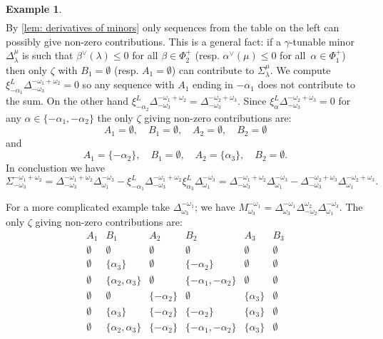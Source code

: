 \documentclass[a4paper]{amsart}
\theoremstyle{definition}
\newtheorem{example}[theorem]{Example}
\begin{document}
\begin{example}
\[\begin{array}{ccc}
    \end{array}
  \]
  By \cref{lem: derivatives of minors} only sequences from the table on the left can possibly give non-zero contributions.
  This is a general fact: if a $\gamma$-tunable minor $\Delta_\lambda^\mu$ is such that $\beta^\vee(\lambda)\leq0$ for all $\beta\in\Phi^+_2$ (resp. $\alpha^\vee(\mu)\leq0$ for all~$\alpha\in\Phi^+_1$) then only $\zeta$ with $B_1=\emptyset$ (resp. $A_1=\emptyset$) can contribute to $\Sigma_\lambda^\mu$.
  We compute $\xi_{-\alpha_1}^L\Delta_{-\omega_3}^{-\omega_1+\omega_2}=0$ so any sequence with $A_1$ ending in $-\alpha_1$ does not contribute to the sum.
  On the other hand $\xi_{-\alpha_2}^L\Delta_{-\omega_3}^{-\omega_1+\omega_2}=\Delta_{-\omega_3}^{-\omega_2+\omega_3}$. 
  Since $\xi_\alpha^L \Delta_{-\omega_3}^{-\omega_2+\omega_3}=0$ for any $\alpha\in\{-\alpha_1, -\alpha_2\}$ the only $\zeta$ giving non-zero contributions are:
  \[
    A_1=\emptyset,\quad B_1 =\emptyset,\quad A_2=\emptyset,\quad B_2=\emptyset
  \]
  and
  \[
    A_1=\{-\alpha_2\},\quad B_1 =\emptyset,\quad A_2=\{\alpha_3\},\quad B_2=\emptyset.
  \]
  In conclustion we have 
  \[
    \Sigma_{-\omega_3}^{-\omega_1+\omega_2} 
    = 
    \Delta_{-\omega_3}^{-\omega_1+\omega_2} \Delta_{\omega_1}^{-\omega_3} - \xi_{-\alpha_1}^L\Delta_{-\omega_3}^{-\omega_1+\omega_2} \xi_{\alpha_3}^L\Delta_{\omega_1}^{-\omega_3}
    =
    \Delta_{-\omega_3}^{-\omega_1+\omega_2} \Delta_{\omega_1}^{-\omega_3} - \Delta_{-\omega_3}^{-\omega_2+\omega_3} \Delta_{\omega_1}^{-\omega_2+\omega_3}.
  \]

  For a more complicated example take $\Delta_{\omega_3}^{-\omega_1}$; we have $M_{\omega_3}^{-\omega_1} = \Delta_{\omega_3}^{-\omega_1} \Delta_{-\omega_2}^{\omega_2} \Delta_{\omega_1}^{-\omega_3}$.
  The only $\zeta$ giving non-zero contributions are:
  \[
    \begin{array}{|c|c||c|c||c|c|}
      \hline
      A_1 & B_1 & A_2 & B_2 & A_3 & B_3 \\
      \hline
      \hline
      \emptyset & \emptyset             & \emptyset & \emptyset               & \emptyset & \emptyset \\
      \emptyset & \{\alpha_3\}          & \emptyset & \{-\alpha_2\}           & \emptyset & \emptyset \\
      \emptyset & \{\alpha_2,\alpha_3\} & \emptyset & \{-\alpha_1,-\alpha_2\} & \emptyset & \emptyset \\

      \emptyset & \emptyset             & \{-\alpha_2\} & \emptyset               & \{\alpha_3\} & \emptyset \\
      \emptyset & \{\alpha_3\}          & \{-\alpha_2\} & \{-\alpha_2\}           & \{\alpha_3\} & \emptyset \\
      \emptyset & \{\alpha_2,\alpha_3\} & \{-\alpha_2\} & \{-\alpha_1,-\alpha_2\} & \{\alpha_3\} & \emptyset \\
      

\end{array}\]
\end{example}
\end{document}
